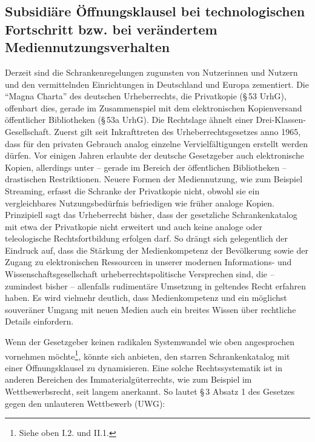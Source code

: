 \documentclass[output=paper]{langscibook}
\begin{document}
\hypertarget{subsidiuxe4re-uxf6ffnungsklausel-bei-technologischen-fortschritt-bzw.-bei-veruxe4ndertem-mediennutzungsverhalten}{%
\subsection{Subsidiäre Öffnungsklausel bei technologischen Fortschritt
bzw. bei verändertem
Mediennutzungsverhalten}\label{subsidiuxe4re-uxf6ffnungsklausel-bei-technologischen-fortschritt-bzw.-bei-veruxe4ndertem-mediennutzungsverhalten}}

Derzeit sind die Schrankenregelungen zugunsten von Nutzerinnen und
Nutzern und den vermittelnden Einrichtungen in Deutschland und Europa
zementiert. Die \enquote{Magna Charta} des deutschen Urheberrechts, die
Privatkopie (§\,53 UrhG), offenbart dies, gerade im Zusammenspiel mit dem
elektronischen Kopienversand öffentlicher Bibliotheken (§\,53a UrhG). Die
Rechtslage ähnelt einer Drei-Klassen-Gesellschaft. Zuerst gilt seit
Inkrafttreten des Urheberrechtsgesetzes anno 1965, dass für den privaten
Gebrauch analog einzelne Vervielfältigungen erstellt werden dürfen. Vor
einigen Jahren erlaubte der deutsche Gesetzgeber auch elektronische
Kopien, allerdings unter -- gerade im Bereich der öffentlichen
Bibliotheken -- drastischen Restriktionen. Neuere Formen der
Mediennutzung, wie zum Beispiel Streaming, erfasst die Schranke der
Privatkopie nicht, obwohl sie ein vergleichbares Nutzungsbedürfnis
befriedigen wie früher analoge Kopien. Prinzipiell sagt das Urheberrecht
bisher, dass der gesetzliche Schrankenkatalog mit etwa der Privatkopie
nicht erweitert und auch keine analoge oder teleologische
Rechtsfortbildung erfolgen darf. So drängt sich gelegentlich der
Eindruck auf, dass die Stärkung der Medienkompetenz der Bevölkerung
sowie der Zugang zu elektronischen Ressourcen in unserer modernen
Informations- und Wissenschaftsgesellschaft urheberrechtspolitische
Versprechen sind, die -- zumindest bisher -- allenfalls rudimentäre
Umsetzung in geltendes Recht erfahren haben. Es wird vielmehr deutlich,
dass Medienkompetenz und ein möglichst souveräner Umgang mit neuen
Medien auch ein breites Wissen über rechtliche Details einfordern.

Wenn der Gesetzgeber keinen radikalen Systemwandel wie oben angesprochen
vornehmen möchte\footnote{Siehe oben I.2. und II.1.}, könnte sich anbieten,
den starren Schrankenkatalog mit einer Öffnungsklausel zu dynamisieren.
Eine solche Rechtssystematik ist in anderen Bereichen des
Immaterialgüterrechts, wie zum Beispiel im Wettbewerbsrecht, seit langem
anerkannt. So lautet §\,3 Absatz 1 des Gesetzes gegen den unlauteren
Wettbewerb (UWG):
\end{document}

